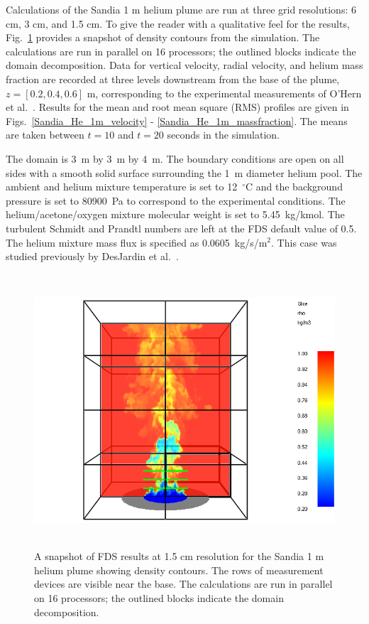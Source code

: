 Calculations of the Sandia 1 m helium plume are run at three grid resolutions: 6 cm, 3 cm, and 1.5 cm.  To give the reader with a qualitative feel for the results, Fig.~\ref{Sandia_He_1m_image} provides a snapshot of density contours from the simulation. The calculations are run in parallel on 16 processors; the outlined blocks indicate the domain decomposition.  Data for vertical velocity, radial velocity, and helium mass fraction are recorded at three levels downstream from the base of the plume, $z = [0.2, 0.4, 0.6]$ m, corresponding to the experimental measurements of O'Hern et al.~\cite{OHern:2005}.  Results for the mean and root mean square (RMS) profiles are given in Figs.~\ref{Sandia_He_1m_velocity} - \ref{Sandia_He_1m_massfraction}.  The means are taken between $t=10$ and $t=20$ seconds in the simulation.

The domain is 3~m by 3~m by 4~m. The boundary conditions are open on all sides with a smooth solid surface surrounding the 1~m diameter helium pool.  The ambient and helium mixture temperature is set to 12~$^\circ$C and the background pressure is set to 80900~Pa to correspond to the experimental conditions.  The helium/acetone/oxygen mixture molecular weight is set to 5.45~kg/kmol.  The turbulent Schmidt and Prandtl numbers are left at the FDS default value of 0.5.  The helium mixture mass flux is specified as 0.0605~kg/s/m$^2$. This case was studied previously by DesJardin et al.~\cite{DesJardin:2004}.
\begin{figure}[h]
\begin{center}
\includegraphics[height=4in]{FIGURES/Sandia_Plumes/Sandia_He_1m_image}
\caption[Sandia 1~m helium plume image]{A snapshot of FDS results at 1.5 cm resolution for the Sandia 1 m helium plume showing density contours.  The rows of measurement devices are visible near the base. The calculations are run in parallel on 16 processors; the outlined blocks indicate the domain decomposition.}
\label{Sandia_He_1m_image}
\end{center}
\end{figure}

